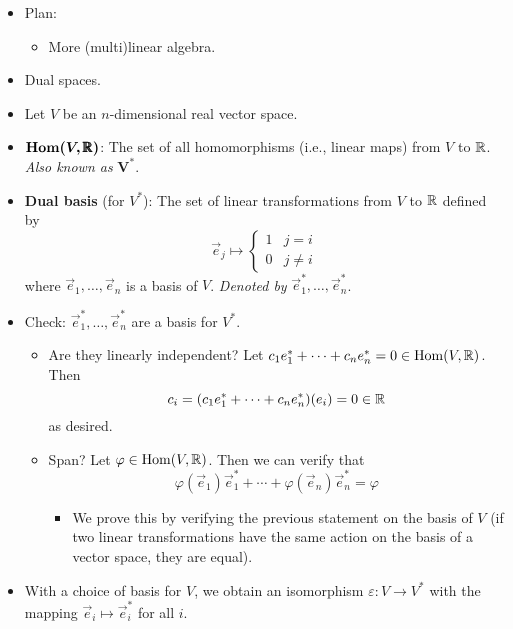 \documentclass[../notes.tex]{subfiles}
\begin{document}
\begin{itemize}
    \item {}Plan:
    \begin{itemize}
        \item More (multi)linear algebra.
    \end{itemize}
    \item Dual spaces.
    \item Let $V$ be an $n$-dimensional real vector space.
    \item $\bm{\Hom(V,\pmb{\R})}$: The set of all homomorphisms (i.e., linear maps) from $V$ to $\mathbb{R}$. \emph{Also known as} $\bm{V^*}$.
    \item \textbf{Dual basis} (for $V^*$): The set of linear transformations from $V$ to $\mathbb{R}$ defined by
    \begin{equation*}
        \vec{e}_j \mapsto
        \begin{cases}
            1 & j=i\\
            0 & j\neq i
        \end{cases}
    \end{equation*}
    where $\vec{e}_1,\dots,\vec{e}_n$ is a basis of $V$. \emph{Denoted by} $\vec{e}_1^*,\dots,\vec{e}_n^*$.
    \item Check: $\vec{e}_1^*,\dots,\vec{e}_n^*$ are a basis for $V^*$.
    \begin{itemize}
        \item Are they linearly independent? Let $c_1e_1^*+\cdots+c_ne_n^*=0\in\operatorname{Hom}(V,\mathbb{R})$. Then
        \begin{equation*}
            c_i = (c_1e_1^*+\cdots+c_ne_n^*)(e_i) = 0\in\mathbb{R}
        \end{equation*}
        as desired.
        \item Span? Let $\varphi\in\operatorname{Hom}(V,\mathbb{R})$. Then we can verify that
        \begin{equation*}
            \varphi(\vec{e}_1)\vec{e}_1^*+\cdots+\varphi(\vec{e}_n)\vec{e}_n^* = \varphi
        \end{equation*}
        \begin{itemize}
            \item We prove this by verifying the previous statement on the basis of $V$ (if two linear transformations have the same action on the basis of a vector space, they are equal).
        \end{itemize}
    \end{itemize}
    \item With a choice of basis for $V$, we obtain an isomorphism $\varepsilon:V\to V^*$ with the mapping $\vec{e}_i\mapsto\vec{e}_i^*$ for all $i$.

\end{itemize}
\end{document}
